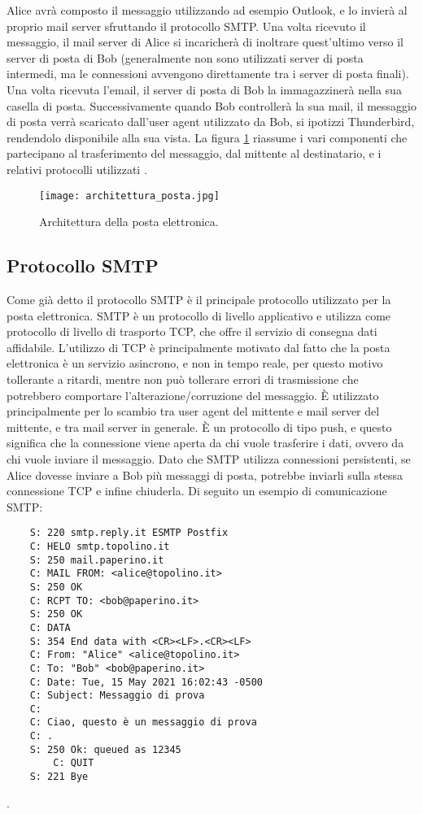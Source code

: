 Alice avrà composto il messaggio utilizzando ad esempio Outlook, e lo invierà al proprio mail server 
sfruttando il protocollo SMTP. Una volta ricevuto il messaggio, il mail server di Alice si incaricherà di 
inoltrare quest'ultimo verso il server di posta di Bob (generalmente non sono utilizzati server di posta intermedi, 
ma le connessioni avvengono direttamente tra i server di posta finali). 
Una volta ricevuta l'email, il server di posta di Bob la immagazzinerà nella sua casella di posta. 
Successivamente quando Bob controllerà la sua mail, il messaggio di posta verrà scaricato dall'user agent 
utilizzato da Bob, si ipotizzi Thunderbird, rendendolo disponibile alla sua vista.
La figura \ref{architetturaPosta} riassume i vari componenti che partecipano al trasferimento del messaggio, dal
mittente al destinatario, e i relativi protocolli utilizzati \cite{kurose2008reti}.

\begin{figure}[htp]
    \centering
    \texttt{[image: architettura\_posta.jpg]}
        \caption{Architettura della posta elettronica.}\label{architetturaPosta}
  \end{figure}


\subsection{Protocollo SMTP}
Come già detto il protocollo SMTP è il principale protocollo utilizzato per la posta elettronica.
SMTP è un protocollo di livello applicativo e utilizza come protocollo di livello di trasporto TCP,
che offre il servizio di consegna dati affidabile. 
L'utilizzo di TCP è principalmente motivato dal fatto che la posta elettronica è un servizio asincrono, 
e non in tempo reale, per questo motivo tollerante a ritardi, mentre non può tollerare errori di trasmissione 
che potrebbero comportare l'alterazione/corruzione del messaggio. 
È utilizzato principalmente per lo scambio tra user agent del mittente e mail server del mittente, e tra mail server 
in generale. È un protocollo di tipo push, e questo significa che la connessione viene aperta da chi vuole 
trasferire i dati, ovvero da chi vuole inviare il messaggio. Dato che SMTP utilizza connessioni persistenti, 
se Alice dovesse inviare a Bob più messaggi di posta, potrebbe inviarli sulla stessa connessione TCP e 
infine chiuderla.
Di seguito un esempio di comunicazione SMTP:
\pagebreak
\begin{verbatim}
    S: 220 smtp.reply.it ESMTP Postfix
    C: HELO smtp.topolino.it
    S: 250 mail.paperino.it
    C: MAIL FROM: <alice@topolino.it>
    S: 250 OK
    C: RCPT TO: <bob@paperino.it>
    S: 250 OK
    C: DATA
    S: 354 End data with <CR><LF>.<CR><LF>
    C: From: "Alice" <alice@topolino.it>
    C: To: "Bob" <bob@paperino.it>
    C: Date: Tue, 15 May 2021 16:02:43 -0500
    C: Subject: Messaggio di prova
    C: 
    C: Ciao, questo è un messaggio di prova
    C: .
    S: 250 Ok: queued as 12345
        C: QUIT
    S: 221 Bye
\end{verbatim}\cite{SMTP}.

